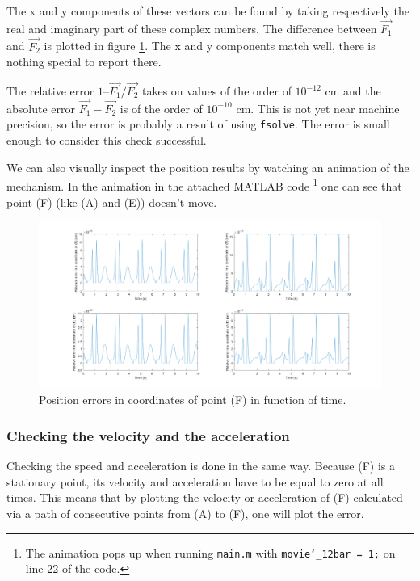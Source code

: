 \documentclass[a4paper]{article}
\begin{document}
The x and y components of these vectors can be found by taking respectively the real and imaginary part of these complex numbers. The difference between \(\vec{F_1}\) and \(\vec{F_2}\) is plotted in figure \ref{fig:contrpos}. The x and y components match well, there is nothing special to report there. 

The relative error \(1 – \vec{F_1}/\vec{F_2}\) takes on values of the order of \(10^{-12}\) cm and the absolute error \(\vec{F_1}-\vec{F_2}\) is of the order of \(10^{-10}\) cm. This is not yet near machine precision, so the error is probably a result of using \texttt{fsolve}. The error is small enough to consider this check successful.

We can also visually inspect the position results by watching an animation of the mechanism. In the animation in the attached MATLAB code \footnote{The animation pops up when running \texttt{main.m} with \texttt{movie\char`_12bar = 1;} on line 22 of the code.} one can see that point (F) (like (A) and (E)) doesn’t move.

\begin{figure}
	\centering
	
	\includegraphics[width = \textwidth]{contrpos.png}
	
	\caption{Position errors in coordinates of point (F) in function of time.}
	\label{fig:contrpos}
	
\end{figure}

\subsubsection{Checking the velocity and the acceleration}

Checking the speed and acceleration is done in the same way. Because (F) is a stationary point, its velocity and acceleration have to be equal to zero at all times. This means that by plotting the velocity or acceleration of (F) calculated via a path of consecutive points from (A) to (F), one will plot the error.
\end{document}
